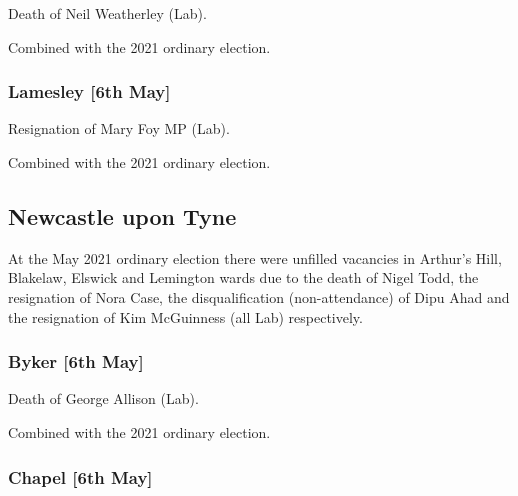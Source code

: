 \documentclass[a4paper,openany]{book}
\begin{document}
\begin{resultsiii}

Death of Neil Weatherley (Lab).

Combined with the 2021 ordinary election.

\subsubsection*{Lamesley \hspace*{\fill}\nolinebreak[1]%
	\enspace\hspace*{\fill}
	[6th May]}


Resignation of Mary Foy MP (Lab).

Combined with the 2021 ordinary election.

\subsection*{Newcastle upon Tyne}

At the May 2021 ordinary election there were unfilled vacancies in Arthur's Hill, Blakelaw, Elswick and Lemington wards due to the death of Nigel Todd, the resignation of Nora Case, the disqualification (non-attendance) of Dipu Ahad and the resignation of Kim McGuinness (all Lab) respectively.

\subsubsection*{Byker \hspace*{\fill}\nolinebreak[1]%
	\enspace\hspace*{\fill}
	[6th May]}


Death of George Allison (Lab).

Combined with the 2021 ordinary election.

\subsubsection*{Chapel \hspace*{\fill}\nolinebreak[1]%
	\enspace\hspace*{\fill}
	[6th May]}


\end{resultsiii}
\end{document}
